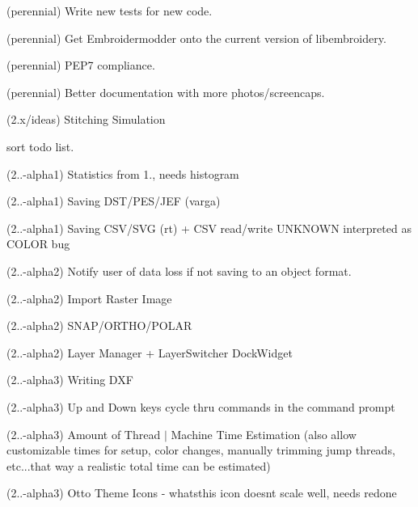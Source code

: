 \begin{DoxyRefList}
(perennial) Write new tests for new code. 



(perennial) Get Embroidermodder onto the current version of libembroidery. 



(perennial) PEP7 compliance. 



(perennial) Better documentation with more photos/screencaps.

\label{todo__todo000109}%
%
(2.\+x/ideas) Stitching Simulation

\label{todo__todo000020}%
%
sort todo list.

\label{todo__todo000021}%
%
(2..-\/alpha1) Statistics from 1., needs histogram

\label{todo__todo000022}%
%
(2..-\/alpha1) Saving DST/\+PES/\+JEF (varga)

\label{todo__todo000023}%
%
(2..-\/alpha1) Saving CSV/\+SVG (rt) + CSV read/write UNKNOWN interpreted as COLOR bug

\label{todo__todo000024}%
%
(2..-\/alpha2) Notify user of data loss if not saving to an object format.

\label{todo__todo000025}%
%
(2..-\/alpha2) Import Raster Image

\label{todo__todo000026}%
%
(2..-\/alpha2) SNAP/\+ORTHO/\+POLAR

\label{todo__todo000027}%
%
(2..-\/alpha2) Layer Manager + Layer\+Switcher Dock\+Widget

\label{todo__todo000029}%
%
(2..-\/alpha3) Writing DXF

\label{todo__todo000030}%
%
(2..-\/alpha3) Up and Down keys cycle thru commands in the command prompt

\label{todo__todo000031}%
%
(2..-\/alpha3) Amount of Thread $|$ Machine Time Estimation (also allow customizable times for setup, color changes, manually trimming jump threads, etc...that way a realistic total time can be estimated)

\label{todo__todo000032}%
%
(2..-\/alpha3) Otto Theme Icons -\/ whatsthis icon doesn\textquotesingle{}t scale well, needs redone


\end{DoxyRefList}

